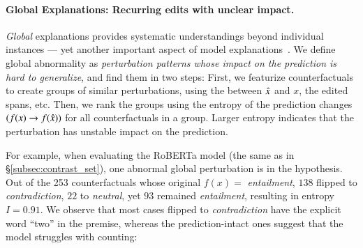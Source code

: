 \paragraph{Global Explanations: Recurring edits with unclear impact.}
\label{subsec:global_exp}
\emph{Global} explanations provides systematic understandings beyond individual instances --- yet another important aspect of model explanations~\cite{miller}.
We define global abnormality as \emph{perturbation patterns whose impact on the prediction is hard to generalize}, and find them in two steps:
First, we featurize counterfactuals to create groups of similar perturbations, using the \tagstr between $\hat{x}$ and $x$, the edited spans, etc.
Then, we rank the groups using the entropy of the prediction changes $(f(x) \rightarrow f(\hat{x}))$ for all counterfactuals in a group.
Larger entropy indicates that the perturbation has unstable impact on the prediction.

For example, when evaluating the \nli RoBERTa model (the same as in \S\ref{subsec:contrast_set}), one abnormal global perturbation is  in the hypothesis.
Out of the 253 counterfactuals whose original $f(x)=$ \emph{entailment}, $138$ flipped to \emph{contradiction}, $22$ to \emph{neutral}, yet $93$ remained \emph{entailment}, resulting in entropy $I=0.91$.
We observe that most cases flipped to \emph{contradiction} have the explicit word ``two'' in the premise, whereas the prediction-intact ones suggest that the model struggles with counting:



